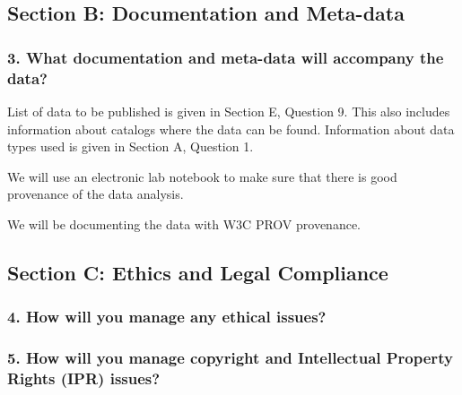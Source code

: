 \documentclass[
]{article}
\begin{document}
\hypertarget{sec-docs-metadata}{}
\hypertarget{section-b-documentation-and-meta-data}{%
\subsection{Section B: Documentation and
Meta-data}\label{section-b-documentation-and-meta-data}}

\hypertarget{q-docs-metadata}{}
\hypertarget{what-documentation-and-meta-data-will-accompany-the-data}{%
\subsubsection{3. What documentation and meta-data will accompany the
data?}\label{what-documentation-and-meta-data-will-accompany-the-data}}

List of data to be published is given in Section E, Question 9. This
also includes information about catalogs where the data can be found.
Information about data types used is given in Section A, Question 1.

We will use an electronic lab notebook to make sure that there is good
provenance of the data analysis.

We will be documenting the data with W3C PROV provenance.

\hypertarget{sec-ethics-legal}{}
\hypertarget{section-c-ethics-and-legal-compliance}{%
\subsection{Section C: Ethics and Legal
Compliance}\label{section-c-ethics-and-legal-compliance}}

\hypertarget{q-ethical-issues}{}
\hypertarget{how-will-you-manage-any-ethical-issues}{%
\subsubsection{4. How will you manage any ethical
issues?}\label{how-will-you-manage-any-ethical-issues}}

\hypertarget{q-ethical-issues}{}
\hypertarget{how-will-you-manage-copyright-and-intellectual-property-rights-ipr-issues}{%
\subsubsection{5. How will you manage copyright and Intellectual
Property Rights (IPR)
issues?}\label{how-will-you-manage-copyright-and-intellectual-property-rights-ipr-issues}}
\end{document}
